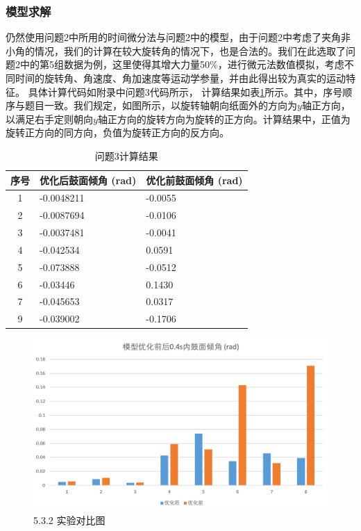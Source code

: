 \documentclass[nocover]{cumcmart}%
\begin{document}
\subsubsection{模型求解}
仍然使用问题2中所用的时间微分法与问题2中的模型，由于问题2中考虑了夹角非小角的情况，我们的计算在较大旋转角的情况下，也是合法的。我们在此选取了问题2中的第5组数据为例，这里使得其增大力量50\%，进行微元法数值模拟，考虑不同时间的旋转角、角速度、角加速度等运动学参量，并由此得出较为真实的运动特征。
具体计算代码如附录中问题3代码所示，
计算结果如表\ref{table:result2}所示。其中，序号顺序与题目一致。我们规定，如图所示，以旋转轴朝向纸面外的方向为$y$轴正方向，以满足右手定则朝向$y$轴正方向的旋转方向为旋转的正方向。计算结果中，正值为旋转正方向的同方向，负值为旋转正方向的反方向。
\begin{table} [!h]
\begin{center}
\vspace{-0.1in}
\caption{问题3计算结果}
\label{table:result2}
\begin{tabular}{|c|l|l|}
\hline
\textbf{序号}&\textbf{优化后鼓面倾角  (rad)}&\textbf{优化前鼓面倾角 (rad)}\\
\hline
1&-0.0048211&-0.0055\\
\hline
2& -0.0087694&-0.0106\\
\hline
3& -0.0037481&-0.0041\\
\hline
4&-0.042534&0.0591\\
\hline
5&-0.073888&-0.0512\\
\hline
6&-0.03446&0.1430\\
\hline
7&-0.045653&0.0317\\
\hline
9&-0.039002&-0.1706\\
\hline
\end{tabular}
\vspace{-0.2in}
\end{center}
\end{table}

\begin{figure}[h!]
    \centering
    \includegraphics[width=1.0\linewidth]{figures/6.png}
    \caption{5.3.2 实验对比图}
    \label{5.3.2 实验对比图}
\end{figure}
\end{document}
